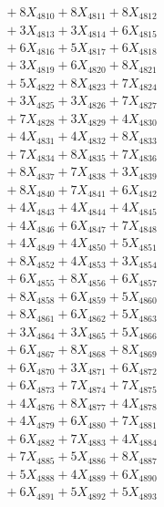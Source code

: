 \documentclass[a4paper,10pt]{article}
\begin{document}
{\begin{align}
&\;  + 8 X_{4810} + 8 X_{4811} + 8 X_{4812} \\[0.3ex]
&\;  + 3 X_{4813} + 3 X_{4814} + 6 X_{4815} \\[0.3ex]
&\;  + 6 X_{4816} + 5 X_{4817} + 6 X_{4818} \\[0.3ex]
&\;  + 3 X_{4819} + 6 X_{4820} + 8 X_{4821} \\[0.3ex]
&\;  + 5 X_{4822} + 8 X_{4823} + 7 X_{4824} \\[0.3ex]
&\;  + 3 X_{4825} + 3 X_{4826} + 7 X_{4827} \\[0.3ex]
&\;  + 7 X_{4828} + 3 X_{4829} + 4 X_{4830} \\[0.3ex]
&\;  + 4 X_{4831} + 4 X_{4832} + 8 X_{4833} \\[0.3ex]
&\;  + 7 X_{4834} + 8 X_{4835} + 7 X_{4836} \\[0.3ex]
&\;  + 8 X_{4837} + 7 X_{4838} + 3 X_{4839} \\[0.5ex]\allowbreak
&\;  + 8 X_{4840} + 7 X_{4841} + 6 X_{4842} \\[0.3ex]
&\;  + 4 X_{4843} + 4 X_{4844} + 4 X_{4845} \\[0.3ex]
&\;  + 4 X_{4846} + 6 X_{4847} + 7 X_{4848} \\[0.3ex]
&\;  + 4 X_{4849} + 4 X_{4850} + 5 X_{4851} \\[0.3ex]
&\;  + 8 X_{4852} + 4 X_{4853} + 3 X_{4854} \\[0.3ex]
&\;  + 6 X_{4855} + 8 X_{4856} + 6 X_{4857} \\[0.3ex]
&\;  + 8 X_{4858} + 6 X_{4859} + 5 X_{4860} \\[0.3ex]
&\;  + 8 X_{4861} + 6 X_{4862} + 5 X_{4863} \\[0.3ex]
&\;  + 3 X_{4864} + 3 X_{4865} + 5 X_{4866} \\[0.3ex]
&\;  + 6 X_{4867} + 8 X_{4868} + 8 X_{4869} \\[0.5ex]\allowbreak
&\;  + 6 X_{4870} + 3 X_{4871} + 6 X_{4872} \\[0.3ex]
&\;  + 6 X_{4873} + 7 X_{4874} + 7 X_{4875} \\[0.3ex]
&\;  + 4 X_{4876} + 8 X_{4877} + 4 X_{4878} \\[0.3ex]
&\;  + 4 X_{4879} + 6 X_{4880} + 7 X_{4881} \\[0.3ex]
&\;  + 6 X_{4882} + 7 X_{4883} + 4 X_{4884} \\[0.3ex]
&\;  + 7 X_{4885} + 5 X_{4886} + 8 X_{4887} \\[0.3ex]
&\;  + 5 X_{4888} + 4 X_{4889} + 6 X_{4890} \\[0.3ex]
&\;  + 6 X_{4891} + 5 X_{4892} + 5 X_{4893} \\[0.3ex]

\end{align}}
\end{document}
